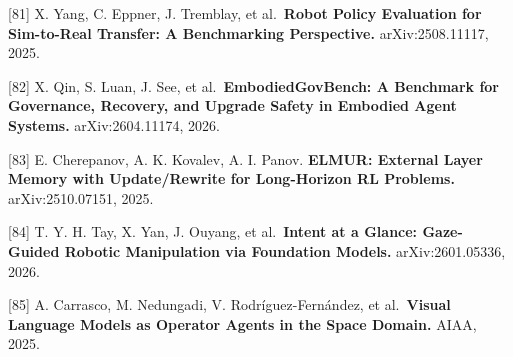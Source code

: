 {[}81{]} X. Yang, C. Eppner, J. Tremblay, et al.~\textbf{Robot Policy Evaluation for Sim-to-Real Transfer: A Benchmarking Perspective.} arXiv:2508.11117, 2025.

{[}82{]} X. Qin, S. Luan, J. See, et al.~\textbf{EmbodiedGovBench: A Benchmark for Governance, Recovery, and Upgrade Safety in Embodied Agent Systems.} arXiv:2604.11174, 2026.

{[}83{]} E. Cherepanov, A. K. Kovalev, A. I. Panov. \textbf{ELMUR: External Layer Memory with Update/Rewrite for Long-Horizon RL Problems.} arXiv:2510.07151, 2025.

{[}84{]} T. Y. H. Tay, X. Yan, J. Ouyang, et al.~\textbf{Intent at a Glance: Gaze-Guided Robotic Manipulation via Foundation Models.} arXiv:2601.05336, 2026.

{[}85{]} A. Carrasco, M. Nedungadi, V. Rodríguez-Fernández, et al.~\textbf{Visual Language Models as Operator Agents in the Space Domain.} AIAA, 2025.

